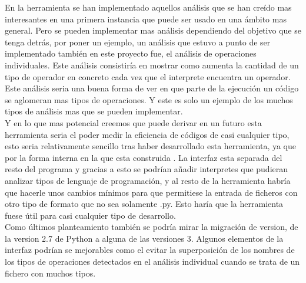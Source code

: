 En la herramienta se han implementado aquellos análisis que se han creído mas interesantes en una primera instancia que puede ser usado en una ámbito mas general. Pero se pueden implementar mas análisis dependiendo del objetivo que se tenga detrás, por poner un ejemplo, un análisis que estuvo a punto de ser implementado también en este proyecto fue, el análisis de operaciones individuales. Este análisis consistiría en mostrar como aumenta la cantidad de un tipo de operador en concreto cada vez que el interprete encuentra un operador. Este análisis seria una buena forma de ver en que parte de la ejecución un código se aglomeran mas tipos de operaciones. Y este es solo un ejemplo de los muchos tipos de análisis mas que se pueden implementar.\\

Y en lo que mas potencial creemos que puede derivar en un futuro esta herramienta seria el poder medir la eficiencia de códigos de casi cualquier tipo, esto seria relativamente sencillo tras haber desarrollado esta herramienta, ya que por la forma interna en la que esta construida . La interfaz esta separada del resto del programa y gracias a esto se podrían añadir interpretes que pudieran analizar tipos de lenguaje de programación, y al resto de la herramienta habría que hacerle unos cambios mínimos para que permitiese la entrada de ficheros con otro tipo de formato que no sea solamente .py. Esto haría que la herramienta fuese útil para casi cualquier tipo de desarrollo.\\

Como últimos planteamiento también se podría mirar la migración de version, de la version 2.7 de Python a alguna de las versiones 3.
Algunos elementos de la interfaz podrían se mejorables como el evitar la superposición de los nombres de los tipos de operaciones detectados en el análisis individual cuando se trata de un fichero con muchos tipos.

